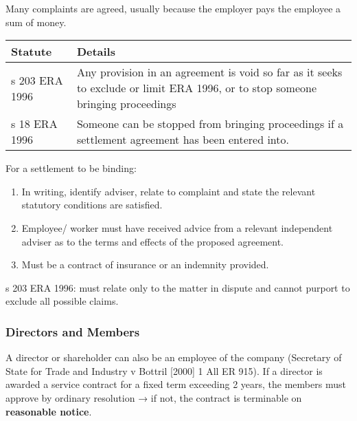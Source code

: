 \documentclass[
]{article}
\providecommand{\tightlist}{%
  \setlength{\itemsep}{0pt}\setlength{\parskip}{0pt}}
\begin{document}
Many complaints are agreed, usually because the employer pays the
employee a sum of money.

\begin{longtable}[]{@{}ll@{}}
\toprule()
Statute & Details \\
\midrule()
\endhead
s 203 ERA 1996 & Any provision in an agreement is void so far as it
seeks to exclude or limit ERA 1996, or to stop someone bringing
proceedings \\
s 18 ERA 1996 & Someone can be stopped from bringing proceedings if a
settlement agreement has been entered into. \\
\bottomrule()
\end{longtable}

For a settlement to be binding:

\begin{enumerate}
\tightlist
\item
  In writing, identify adviser, relate to complaint and state the
  relevant statutory conditions are satisfied.
\item
  Employee/ worker must have received advice from a relevant independent
  adviser as to the terms and effects of the proposed agreement.
\item
  Must be a contract of insurance or an indemnity provided.
\end{enumerate}

s 203 ERA 1996: must relate only to the matter in dispute and cannot
purport to exclude all possible claims.

\hypertarget{directors-and-members}{%
\subsubsection{Directors and Members}\label{directors-and-members}}

A director or shareholder can also be an employee of the company
(Secretary of State for Trade and Industry v Bottril {[}2000{]} 1 All ER
915). If a director is awarded a service contract for a fixed term
exceeding 2 years, the members must approve by ordinary resolution → if
not, the contract is terminable on \textbf{reasonable notice}.
\end{document}

